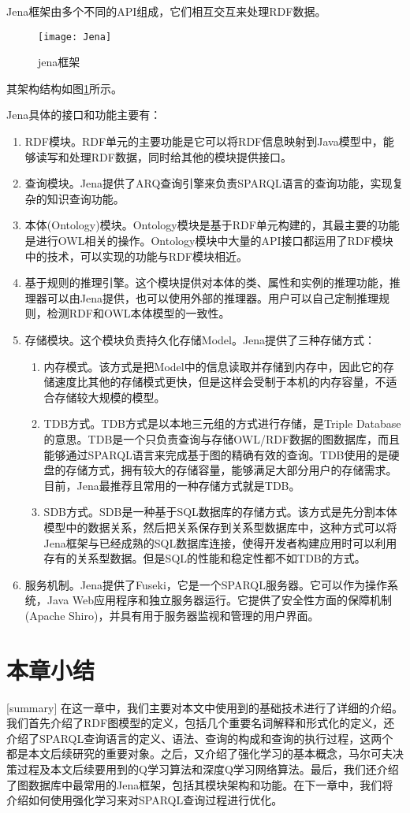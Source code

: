 Jena框架由多个不同的API组成，它们相互交互来处理RDF数据。
\begin{figure}[h]
    \centering
    \texttt{[image: Jena]}
    \caption{jena框架}
    \label{Jena}
\end{figure}
其架构结构如图\ref{Jena}所示。

Jena具体的接口和功能主要有：
\begin{enumerate}
    \item RDF模块。RDF单元的主要功能是它可以将RDF信息映射到Java模型中，能够读写和处理RDF数据，同时给其他的模块提供接口。
    \item 查询模块。Jena提供了ARQ查询引擎来负责SPARQL语言的查询功能，实现复杂的知识查询功能。
    \item 本体(Ontology)模块。Ontology模块是基于RDF单元构建的，其最主要的功能是进行OWL相关的操作。Ontology模块中大量的API接口都运用了RDF模块中的技术，可以实现的功能与RDF模块相近。
    \item 基于规则的推理引擎。这个模块提供对本体的类、属性和实例的推理功能，推理器可以由Jena提供，也可以使用外部的推理器。用户可以自己定制推理规则，检测RDF和OWL本体模型的一致性。
    \item 存储模块。这个模块负责持久化存储Model。Jena提供了三种存储方式：
    \begin{enumerate}
        \item 内存模式。该方式是把Model中的信息读取并存储到内存中，因此它的存储速度比其他的存储模式更快，但是这样会受制于本机的内存容量，不适合存储较大规模的模型。
        \item TDB方式。TDB方式是以本地三元组的方式进行存储，是Triple Database的意思。TDB是一个只负责查询与存储OWL/RDF数据的图数据库，而且能够通过SPARQL语言来完成基于图的精确有效的查询。TDB使用的是硬盘的存储方式，拥有较大的存储容量，能够满足大部分用户的存储需求。目前，Jena最推荐且常用的一种存储方式就是TDB。
        \item SDB方式。SDB是一种基于SQL数据库的存储方式。该方式是先分割本体模型中的数据关系，然后把关系保存到关系型数据库中，这种方式可以将Jena框架与已经成熟的SQL数据库连接，使得开发者构建应用时可以利用存有的关系型数据。但是SQL的性能和稳定性都不如TDB的方式。
    \end{enumerate}
    \item 服务机制。Jena提供了Fuseki，它是一个SPARQL服务器。它可以作为操作系统，Java Web应用程序和独立服务器运行。它提供了安全性方面的保障机制(Apache Shiro)，并具有用于服务器监视和管理的用户界面。
\end{enumerate}

\section{本章小结}[summary]
在这一章中，我们主要对本文中使用到的基础技术进行了详细的介绍。我们首先介绍了RDF图模型的定义，包括几个重要名词解释和形式化的定义，还介绍了SPARQL查询语言的定义、语法、查询的构成和查询的执行过程，这两个都是本文后续研究的重要对象。之后，又介绍了强化学习的基本概念，马尔可夫决策过程及本文后续要用到的Q学习算法和深度Q学习网络算法。最后，我们还介绍了图数据库中最常用的Jena框架，包括其模块架构和功能。在下一章中，我们将介绍如何使用强化学习来对SPARQL查询过程进行优化。

